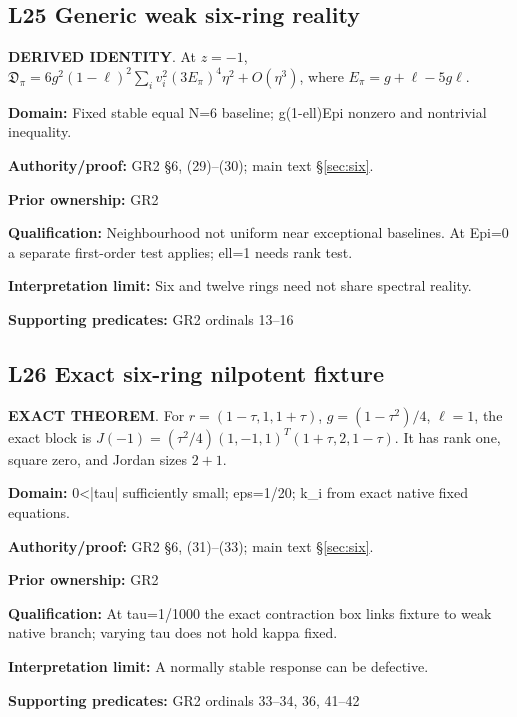 \par\noindent\begin{minipage}{\linewidth}
\subsection*{L25 Generic weak six-ring reality}
\textbf{DERIVED IDENTITY}. At \(z=-1\), \(\mathfrak D_\pi=6g^2(1-\ell)^2\sum_i v_i^2(3E_\pi)^4\eta^2+O(\eta^3)\), where \(E_\pi=g+\ell-5g\ell\).\par
\textbf{Domain:} Fixed stable equal N=6 baseline; g(1-ell)Epi nonzero and nontrivial inequality.\par
\textbf{Authority/proof:} GR2 \S{}6, (29)--(30); main text \S\ref{sec:six}.\par
\textbf{Prior ownership:} GR2\par
\textbf{Qualification:} Neighbourhood not uniform near exceptional baselines. At Epi=0 a separate first-order test applies; ell=1 needs rank test.\par
\textbf{Interpretation limit:} Six and twelve rings need not share spectral reality.\par
\textbf{Supporting predicates:} GR2 ordinals 13--16\par
\end{minipage}\par\medskip
\par\noindent\begin{minipage}{\linewidth}
\subsection*{L26 Exact six-ring nilpotent fixture}
\textbf{EXACT THEOREM}. For \(r=(1-\tau,1,1+\tau)\), \(g=(1-\tau^2)/4\), \(\ell=1\), the exact block is \(J(-1)=(\tau^2/4)(1,-1,1)^T(1+\tau,2,1-\tau)\). It has rank one, square zero, and Jordan sizes \(2+1\).\par
\textbf{Domain:} 0<|tau| sufficiently small; eps=1/20; k\_i from exact native fixed equations.\par
\textbf{Authority/proof:} GR2 \S{}6, (31)--(33); main text \S\ref{sec:six}.\par
\textbf{Prior ownership:} GR2\par
\textbf{Qualification:} At tau=1/1000 the exact contraction box links fixture to weak native branch; varying tau does not hold kappa fixed.\par
\textbf{Interpretation limit:} A normally stable response can be defective.\par
\textbf{Supporting predicates:} GR2 ordinals 33--34, 36, 41--42\par
\end{minipage}\par\medskip
